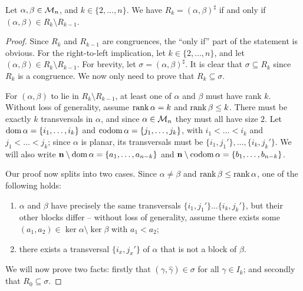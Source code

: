 \begin{lemma}
  \label{lem:rees-genpairs}
  Let $\alpha,\beta \in \mathcal{M}_n$, and $k \in \{2, \ldots, n\}$.  We have
  $R_k = (\alpha, \beta)^\sharp$ if and only if
  $(\alpha, \beta) \in R_k \setminus R_{k-1}$.
  \begin{proof}
    Since $R_k$ and $R_{k-1}$ are congruences, the ``only if'' part of the
    statement is obvious.  For the right-to-left implication, let
    $k \in \{2, \ldots, n\}$, and let
    $(\alpha, \beta) \in R_k \setminus R_{k-1}$.  For brevity, let
    $\sigma = (\alpha, \beta)^\sharp$.  It is clear that $\sigma \subseteq R_k$
    since $R_k$ is a congruence.  We now only need to prove that
    $R_k \subseteq \sigma$.

    For $(\alpha, \beta)$ to lie in $R_k \setminus R_{k-1}$, at least one of
    $\alpha$ and $\beta$ must have rank $k$.  Without loss of generality, assume
    $\operatorname{rank}\alpha = k$ and $\operatorname{rank}\beta \leq k$.  There must be exactly $k$
    transversals in $\alpha$, and since $\alpha \in \mathcal{M}_n$ they must all have
    size $2$.  Let $\operatorname{dom}\alpha = \{i_1, \ldots, i_k\}$ and
    $\operatorname{codom}\alpha = \{j_1, \ldots, j_k\}$, with $i_1 < \ldots < i_k$ and
    $j_1 < \ldots < j_k$; since $\alpha$ is planar, its transversals must be
    $\{i_1, j_1'\}, \ldots, \{i_k, j_k'\}$.  We will also write
    $\mathbf{n} \setminus \operatorname{dom}\alpha = \{a_1, \ldots, a_{n-k}\}$ and
    $\mathbf{n} \setminus \operatorname{codom}\alpha = \{b_1, \ldots, b_{n-k}\}$.

    Our proof now splits into two cases.  Since $\alpha \neq \beta$ and
    $\operatorname{rank}\beta \leq \operatorname{rank}\alpha$, one of the following holds:
    \begin{enumerate}[\rm(a)]
    \item $\alpha$ and $\beta$ have precisely the same transversals
      $\{i_1, j_1'\} \ldots \{i_k, j_k'\}$, but their other blocks
      differ -- without loss of generality, assume there exists some
      $(a_1,a_2) \in \ker\alpha \setminus \ker\beta$ with $a_1 < a_2$;
    \item there exists a transversal $\{i_x,j_x'\}$ of $\alpha$ that is not a
      block of $\beta$.
    \end{enumerate}
    We will now prove two facts: firstly that
    $(\gamma, \widehat\gamma) \in \sigma$ for all $\gamma \in I_k$; and secondly
    that $R_0 \subseteq \sigma$.


\end{proof}
\end{lemma}
